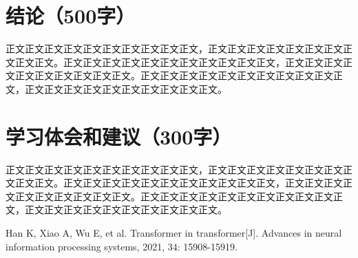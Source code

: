 \documentclass{article}
\begin{document}

  
\section{结论（500字）}
正文正文正文正文正文正文正文正文正文正文，正文正文正文正文正文正文正文正文正文正文。正文正文正文正文正文正文正文正文正文正文正文，正文正文正文正文正文正文正文正文正文正文。正文正文正文正文正文正文正文正文正文正文正文，正文正文正文正文正文正文正文正文正文正文。

\section{学习体会和建议（300字）}
正文正文正文正文正文正文正文正文正文正文，正文正文正文正文正文正文正文正文正文正文。正文正文正文正文正文正文正文正文正文正文正文，正文正文正文正文正文正文正文正文正文正文。正文正文正文正文正文正文正文正文正文正文正文，正文正文正文正文正文正文正文正文正文正文。

\begin{thebibliography}{10}

Han K, Xiao A, Wu E, et al. Transformer in transformer[J]. Advances in neural information processing systems, 2021, 34: 15908-15919.
\end{thebibliography}

\newpage{}
\appendix
\end{document}
